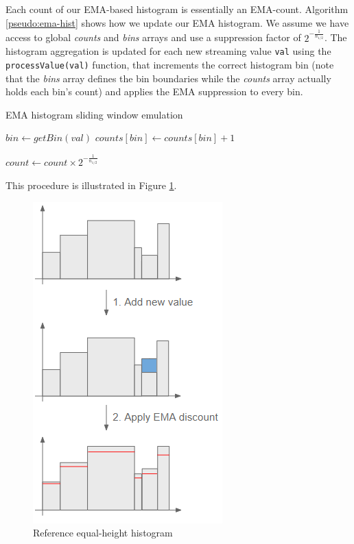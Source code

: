\documentclass[sigconf]{acmart}
\begin{document}
Each count of our EMA-based histogram is essentially an EMA-count. Algorithm \ref{pseudo:ema-hist} shows how we update our EMA histogram. We assume we have access to global \textit{counts} and \textit{bins} arrays and use a suppression factor of $2^{- \frac{1}{n_{1/2}}}$. The histogram aggregation is updated for each new streaming value \texttt{val} using the \texttt{processValue(val)} function, that increments the correct histogram bin (note that the \textit{bins} array defines the bin boundaries while the \textit{counts} array actually holds each bin's count) and applies the EMA suppression to every bin.
\begin{algorithm}[!htb]
    \caption[EMA histogram]{EMA histogram sliding window emulation}
    \label{pseudo:ema-hist}
    \begin{algorithmic}[1]
            \State {}
        \EndFunction
        
            \State $bin \gets getBin(val)$
            \State $counts[bin] \gets counts[bin] + 1$ 
            
             
                \State $count \gets count \times 2^{- \frac{1}{n_{1/2}}}$
            \EndFor
        \EndFunction
    \end{algorithmic}
\end{algorithm}
This procedure is illustrated in Figure \ref{fig:EMA-hist-build}.
\begin{figure}[!htb]
    \begin{center}
      \includegraphics[scale=0.6]{figures/ema-hist-paper.png}
      \caption[]{Reference equal-height histogram}
      \label{fig:EMA-hist-build}
    \end{center}
\end{figure}
\end{document}
